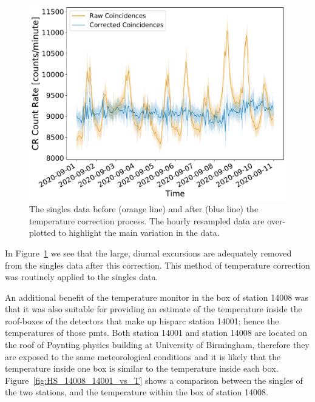 \begin{figure}[ht!]
	\centering
	\includegraphics[width=0.6\columnwidth]{raw_vs_corrected_singles.pdf}
	\caption{The singles data before (orange line) and after (blue line) the temperature correction process. The hourly resampled data are over-plotted to highlight the main variation in the data.}
	\label{fig:HS_14008_corrected_singles}
\end{figure}

In Figure~\ref{fig:HS_14008_corrected_singles} we see that the large, diurnal excursions are adequately removed from the singles data after this correction. This method of temperature correction was routinely applied to the singles data. %


An additional benefit of the temperature monitor in the box of station 14008 was that it was also suitable for providing an estimate of the temperature inside the roof-boxes of the detectors that make up \gls{hisparc} station 14001; hence the temperatures of those \glspl{pmt}. Both station 14001 and station 14008 are located on the roof of Poynting physics building at University of Birmingham, therefore they are exposed to the same meteorological conditions and it is likely that the temperature inside one box is similar to the temperature inside each box. Figure~\ref{fig:HS_14008_14001_vs_T} shows a comparison between the singles of the two stations, and the temperature within the box of station 14008.


